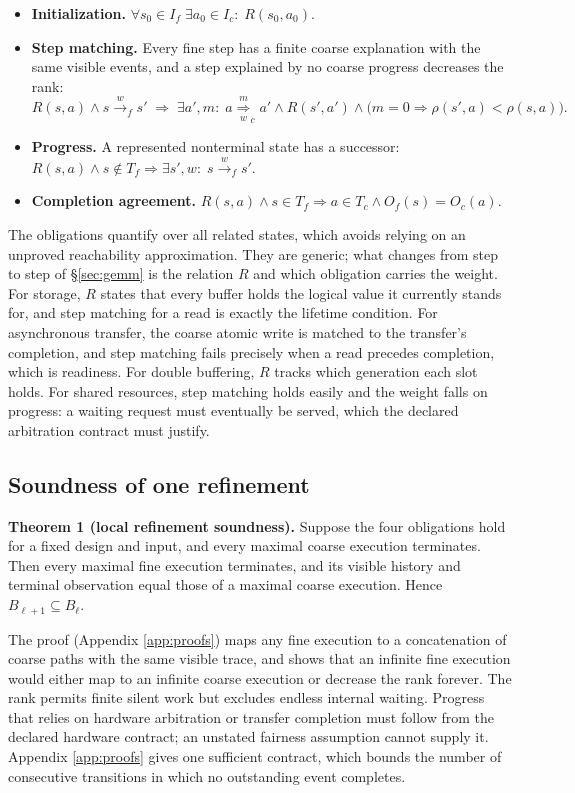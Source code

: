 \documentclass[11pt]{article}
\providecommand{\tightlist}{\setlength{\itemsep}{0pt}\setlength{\parskip}{0pt}}
\begin{document}
\begin{itemize}
\tightlist
\item \textbf{Initialization.} \(\forall s_0\in I_f\;\exists a_0\in I_c:\;R(s_0,a_0)\).
\item \textbf{Step matching.} Every fine step has a finite coarse explanation with the same visible events, and a step explained by no coarse progress decreases the rank:
  \[R(s,a)\land s\xrightarrow{w}_f s'\;\Longrightarrow\;\exists a',m:\;a\overset{m}{\underset{w}{\Rightarrow}}_c a'\land R(s',a')\land\bigl(m=0\Rightarrow\rho(s',a)<\rho(s,a)\bigr).\]
\item \textbf{Progress.} A represented nonterminal state has a successor: \(R(s,a)\land s\notin T_f\Rightarrow\exists s',w:\;s\xrightarrow{w}_f s'\).
\item \textbf{Completion agreement.} \(R(s,a)\land s\in T_f\Rightarrow a\in T_c\land O_f(s)=O_c(a)\).
\end{itemize}

The obligations quantify over all related states, which avoids relying on an unproved reachability approximation. They are generic; what changes from step to step of §\ref{sec:gemm} is the relation \(R\) and which obligation carries the weight. For storage, \(R\) states that every buffer holds the logical value it currently stands for, and step matching for a read is exactly the lifetime condition. For asynchronous transfer, the coarse atomic write is matched to the transfer's completion, and step matching fails precisely when a read precedes completion, which is readiness. For double buffering, \(R\) tracks which generation each slot holds. For shared resources, step matching holds easily and the weight falls on progress: a waiting request must eventually be served, which the declared arbitration contract must justify.

\subsection{Soundness of one refinement}\label{sec:soundness}

\textbf{Theorem 1 (local refinement soundness).} Suppose the four obligations hold for a fixed design and input, and every maximal coarse execution terminates. Then every maximal fine execution terminates, and its visible history and terminal observation equal those of a maximal coarse execution. Hence \(B_{\ell+1}\subseteq B_\ell\).

The proof (Appendix \ref{app:proofs}) maps any fine execution to a concatenation of coarse paths with the same visible trace, and shows that an infinite fine execution would either map to an infinite coarse execution or decrease the rank forever. The rank permits finite silent work but excludes endless internal waiting. Progress that relies on hardware arbitration or transfer completion must follow from the declared hardware contract; an unstated fairness assumption cannot supply it. Appendix \ref{app:proofs} gives one sufficient contract, which bounds the number of consecutive transitions in which no outstanding event completes.
\end{document}
